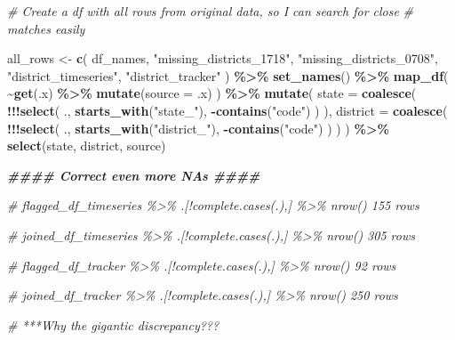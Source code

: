 \documentclass[
]{article}
\newenvironment{Shaded}{\begin{snugshade}}{\end{snugshade}}
\newcommand{\AttributeTok}[1]{\textcolor[rgb]{0.13,0.29,0.53}{#1}}
\newcommand{\CommentTok}[1]{\textcolor[rgb]{0.56,0.35,0.01}{\textit{#1}}}
\newcommand{\DocumentationTok}[1]{\textcolor[rgb]{0.56,0.35,0.01}{\textbf{\textit{#1}}}}
\newcommand{\FunctionTok}[1]{\textcolor[rgb]{0.13,0.29,0.53}{\textbf{#1}}}
\newcommand{\NormalTok}[1]{#1}
\newcommand{\OtherTok}[1]{\textcolor[rgb]{0.56,0.35,0.01}{#1}}
\newcommand{\SpecialCharTok}[1]{\textcolor[rgb]{0.81,0.36,0.00}{\textbf{#1}}}
\newcommand{\StringTok}[1]{\textcolor[rgb]{0.31,0.60,0.02}{#1}}
\begin{document}
\begin{Shaded}
\begin{Highlighting}[]
\CommentTok{\# Create a df with all rows from original data, so I can search for close}
\CommentTok{\# matches easily}

\NormalTok{all\_rows }\OtherTok{\textless{}{-}} \FunctionTok{c}\NormalTok{(}
\NormalTok{    df\_names, }\StringTok{"missing\_districts\_1718"}\NormalTok{, }\StringTok{"missing\_districts\_0708"}\NormalTok{,}
    \StringTok{"district\_timeseries"}\NormalTok{, }\StringTok{"district\_tracker"}
\NormalTok{) }\SpecialCharTok{\%\textgreater{}\%}
    \FunctionTok{set\_names}\NormalTok{() }\SpecialCharTok{\%\textgreater{}\%}
    \FunctionTok{map\_df}\NormalTok{(}
        \SpecialCharTok{\textasciitilde{}}\FunctionTok{get}\NormalTok{(.x) }\SpecialCharTok{\%\textgreater{}\%}
            \FunctionTok{mutate}\NormalTok{(}\AttributeTok{source =}\NormalTok{ .x)}
\NormalTok{    ) }\SpecialCharTok{\%\textgreater{}\%}
    \FunctionTok{mutate}\NormalTok{(}
        \AttributeTok{state =} \FunctionTok{coalesce}\NormalTok{(}
            \SpecialCharTok{!!!}\FunctionTok{select}\NormalTok{(}
\NormalTok{                ., }\FunctionTok{starts\_with}\NormalTok{(}\StringTok{"state\_"}\NormalTok{),}
                \SpecialCharTok{{-}}\FunctionTok{contains}\NormalTok{(}\StringTok{"code"}\NormalTok{)}
\NormalTok{            )}
\NormalTok{        ),}
        \AttributeTok{district =} \FunctionTok{coalesce}\NormalTok{(}
            \SpecialCharTok{!!!}\FunctionTok{select}\NormalTok{(}
\NormalTok{                ., }\FunctionTok{starts\_with}\NormalTok{(}\StringTok{"district\_"}\NormalTok{),}
                \SpecialCharTok{{-}}\FunctionTok{contains}\NormalTok{(}\StringTok{"code"}\NormalTok{)}
\NormalTok{            )}
\NormalTok{        )}
\NormalTok{    ) }\SpecialCharTok{\%\textgreater{}\%}
    \FunctionTok{select}\NormalTok{(state, district, source)}



\DocumentationTok{\#\#\#\# Correct even more NAs \#\#\#\#}

\CommentTok{\# flagged\_df\_timeseries \%\textgreater{}\% .[!complete.cases(.),] \%\textgreater{}\% nrow() 155 rows}

\CommentTok{\# joined\_df\_timeseries \%\textgreater{}\% .[!complete.cases(.),] \%\textgreater{}\% nrow() 305 rows}

\CommentTok{\# flagged\_df\_tracker \%\textgreater{}\% .[!complete.cases(.),] \%\textgreater{}\% nrow() 92 rows}

\CommentTok{\# joined\_df\_tracker \%\textgreater{}\% .[!complete.cases(.),] \%\textgreater{}\% nrow() 250 rows}


\CommentTok{\# ***Why the gigantic discrepancy???}
\end{Highlighting}
\end{Shaded}
\end{document}
